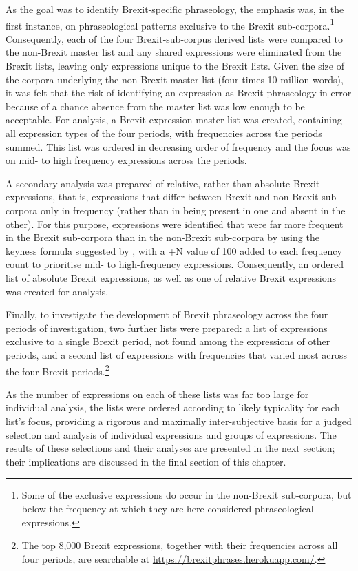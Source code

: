 \documentclass[output=paper]{langscibook}
\begin{document}
As the goal was to identify Brexit-specific phraseology, the emphasis was, in the first instance, on phraseological patterns exclusive to the Brexit sub-corpora.\footnote{Some of the exclusive expressions do occur in the non-Brexit sub-corpora, but below the frequency at which they are here considered phraseological expressions.} Consequently, each of the four Brexit-sub-corpus derived lists were compared to the non-Brexit master list and any shared expressions were eliminated from the Brexit lists, leaving only expressions unique to the Brexit lists. Given the size of the corpora underlying the non-Brexit master list (four times 10 million words), it was felt that the risk of identifying an expression as Brexit phraseology in error because of a chance absence from the master list was low enough to be acceptable. For analysis, a Brexit expression master list was created, containing all expression types of the four periods, with frequencies across the periods summed. This list was ordered in decreasing order of frequency and the focus was on mid- to high frequency expressions across the periods.

A secondary analysis was prepared of relative, rather than absolute Brexit expressions, that is, expressions that differ between Brexit and non-Brexit sub-corpora only in frequency (rather than in being present in one and absent in the other). For this purpose, expressions were identified that were far more frequent in the Brexit sub-corpora than in the non-Brexit sub-corpora by using the keyness formula suggested by \citet{Kilgarriff2009}, with a +N value of 100 added to each frequency count to prioritise mid- to high-frequency expressions. Consequently, an ordered list of absolute Brexit expressions, as well as one of relative Brexit expressions was created for analysis.

Finally, to investigate the development of Brexit phraseology across the four periods of investigation, two further lists were prepared: a list of expressions exclusive to a single Brexit period, not found among the expressions of other periods, and a second list of expressions with frequencies that varied most across the four Brexit periods.\footnote{The top 8,000 Brexit expressions, together with their frequencies across all four periods, are searchable at \url{https://brexitphrases.herokuapp.com/}.}

As the number of expressions on each of these lists was far too large for individual analysis, the lists were ordered according to likely typicality for each list’s focus, providing a rigorous and maximally inter-subjective basis for a judged selection and analysis of individual expressions and groups of expressions. The results of these selections and their analyses are presented in the next section; their implications are discussed in the final section of this chapter.
\end{document}
